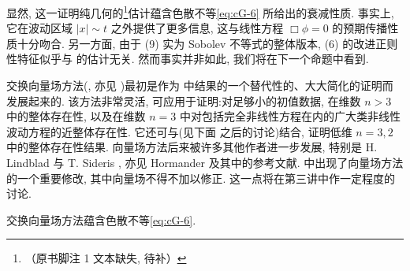 \begin{remark}\label{rem:cG-1.7}
显然, 这一证明纯几何的\footnote{（原书脚注 1 文本缺失, 待补）}估计蕴含色散不等\eqref{eq:cG-6} 所给出的衰减性质. 事实上, 它在波动区域 $|x| \sim t$ 之外提供了更多信息, 这与线性方程 $\Box\phi = 0$ 的预期传播性质十分吻合. 另一方面, 由于 (9) 实为 Sobolev 不等式的整体版本, (6) 的改进正则性特征似乎与 的估计无关. 然而事实并非如此, 我们将在下一个命题中看到. 
\end{remark}

\begin{remark}\label{rem:cG-1.8}
交换向量场方法(\cite{gfref27}, 亦见 \cite{gfref46})最初是作为 \cite{gfref17} 中结果的一个替代性的、大大简化的证明而发展起来的. 该方法非常灵活, 可应用于证明:对足够小的初值数据, 在维数 $n > 3$ 中的整体存在性, 以及在维数 $n = 3$ 中对包括完全非线性方程在内的广大类非线性波动方程的近整体存在性. 它还可与(见下面 之后的讨论)结合, 证明低维 $n = 3,  2$ 中的整体存在性结果. 向量场方法后来被许多其他作者进一步发展, 特别是 H. Lindblad \cite{gfref48} 与 T. Sideris \cite{gfref63, gfref64, gfref65}, 亦见 Hormander \cite{gfref16} 及其中的参考文献. \cite{gfref12} 中出现了向量场方法的一个重要修改, 其中向量场不得不加以修正. 这一点将在第三讲中作一定程度的讨论. 
\end{remark}

\begin{proposition}[见 {[}30{]}]\label{prop:cG-1.9}
交换向量场方法蕴含色散不等\eqref{eq:cG-6}. 
\end{proposition}

